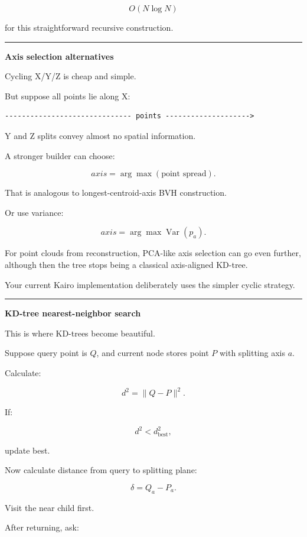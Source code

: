 \[
O(N\log N)
\]

for this straightforward recursive construction.

\begin{center}\rule{0.5\linewidth}{0.5pt}\end{center}

\textbf{Axis selection alternatives}

Cycling X/Y/Z is cheap and simple.

But suppose all points lie along X:

\begin{verbatim}
------------------------------ points -------------------->
\end{verbatim}

Y and Z splits convey almost no spatial information.

A stronger builder can choose:

\[
axis=
\arg\max(
\text{point spread}
).
\]

That is analogous to longest-centroid-axis BVH construction.

Or use variance:

\[
axis=
\arg\max
\operatorname{Var}(p_a).
\]

For point clouds from reconstruction, PCA-like axis selection can go even further, although then the tree stops being a classical axis-aligned KD-tree.

Your current Kairo implementation deliberately uses the simpler cyclic strategy.

\begin{center}\rule{0.5\linewidth}{0.5pt}\end{center}

\textbf{KD-tree nearest-neighbor search}

This is where KD-trees become beautiful.

Suppose query point is \(Q\), and current node stores point \(P\) with splitting axis \(a\).

Calculate:

\[
d^2=\|Q-P\|^2.
\]

If:

\[
d^2<d^2_{\text{best}},
\]

update best.

Now calculate distance from query to splitting plane:

\[
\delta=Q_a-P_a.
\]

Visit the near child first.

After returning, ask:

